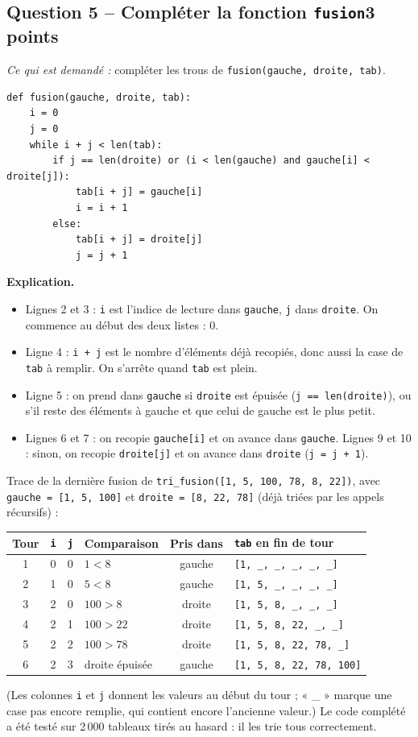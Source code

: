 \documentclass[11pt, a4paper]{exam}
\newcommand{\code}[1]{\texttt{#1}}
\newcommand{\Qt}[2]{\subsection*{#1\hfill{\normalfont\small #2}}}
\newcommand{\rappel}[1]{\noindent\textit{Ce qui est demandé :} #1\par\smallskip}
\newcommand{\explication}{\noindent\textbf{Explication.}\ }
\begin{document}
\Qt{Question 5 -- Compléter la fonction \code{fusion}}{3 points}
\rappel{compléter les trous de \code{fusion(gauche, droite, tab)}.}
\begin{reponse}
\begin{lstlisting}
def fusion(gauche, droite, tab):
    i = 0
    j = 0
    while i + j < len(tab):
        if j == len(droite) or (i < len(gauche) and gauche[i] < droite[j]):
            tab[i + j] = gauche[i]
            i = i + 1
        else:
            tab[i + j] = droite[j]
            j = j + 1
\end{lstlisting}
\end{reponse}
\explication
\begin{itemize}
\item Lignes 2 et 3 : \code{i} est l'indice de lecture dans \code{gauche}, \code{j} dans \code{droite}. On commence au début des deux listes : 0.
\item Ligne 4 : \code{i + j} est le nombre d'éléments déjà recopiés, donc aussi la case de \code{tab} à remplir. On s'arrête quand \code{tab} est plein.
\item Ligne 5 : on prend dans \code{gauche} si \code{droite} est épuisée (\code{j == len(droite)}), ou s'il reste des éléments à gauche et que celui de gauche est le plus petit.
\item Lignes 6 et 7 : on recopie \code{gauche[i]} et on avance dans \code{gauche}. Lignes 9 et 10 : sinon, on recopie \code{droite[j]} et on avance dans \code{droite} (\code{j = j + 1}).
\end{itemize}

Trace de la dernière fusion de \code{tri\_fusion([1, 5, 100, 78, 8, 22])}, avec \code{gauche = [1, 5, 100]} et \code{droite = [8, 22, 78]} (déjà triées par les appels récursifs) :
\begin{center}\small
\begin{tabular}{|c|c|c|l|c|l|}\hline
Tour & \code{i} & \code{j} & Comparaison & Pris dans & \code{tab} en fin de tour \\\hline
1 & 0 & 0 & $1 < 8$ & gauche & \code{[1, \_, \_, \_, \_, \_]} \\
2 & 1 & 0 & $5 < 8$ & gauche & \code{[1, 5, \_, \_, \_, \_]} \\
3 & 2 & 0 & $100 > 8$ & droite & \code{[1, 5, 8, \_, \_, \_]} \\
4 & 2 & 1 & $100 > 22$ & droite & \code{[1, 5, 8, 22, \_, \_]} \\
5 & 2 & 2 & $100 > 78$ & droite & \code{[1, 5, 8, 22, 78, \_]} \\
6 & 2 & 3 & droite épuisée & gauche & \code{[1, 5, 8, 22, 78, 100]} \\\hline
\end{tabular}
\end{center}
(Les colonnes \code{i} et \code{j} donnent les valeurs au début du tour ; « \_ » marque une case pas encore remplie, qui contient encore l'ancienne valeur.) Le code complété a été testé sur 2\,000 tableaux tirés au hasard : il les trie tous correctement.
\end{document}
